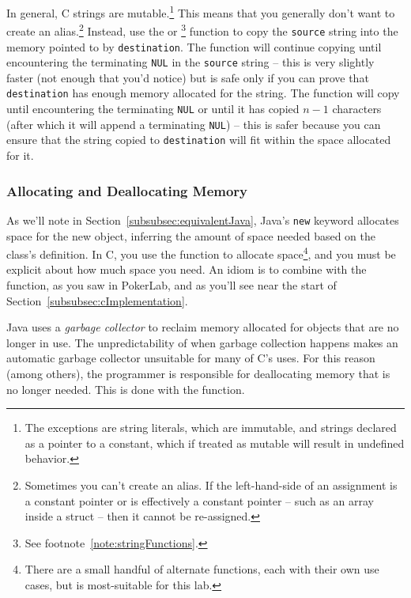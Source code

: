 In general, C strings are mutable.\footnote{
    The exceptions are string literals, which are immutable, and strings declared as a pointer to a constant, which if treated as mutable will result in undefined behavior.
}
This means that you generally don't want to create an alias.\footnote{
    Sometimes you can't create an alias.
    If the left-hand-side of an assignment is a constant pointer or is effectively a constant pointer -- such as an array inside a struct -- then it cannot be re-assigned.
}
Instead, use the  or \footnote{See footnote~\ref{note:stringFunctions}.} function to copy the \lstinline{source} string into the memory pointed to by \lstinline{destination}.
The  function will continue copying until encountering the terminating \lstinline{NUL} in the \lstinline{source} string -- this is very slightly faster (not enough that you'd notice) but is safe only if you can prove that \lstinline{destination} has enough memory allocated for the string.
The  function will copy until encountering the terminating \lstinline{NUL} or until it has copied $n-1$ characters (after which it will append a terminating \lstinline{NUL}) -- this is safer because you can ensure that the string copied to \lstinline{destination} will fit within the space allocated for it.

\subsubsection{Allocating and Deallocating Memory}

As we'll note in Section~\ref{subsubsec:equivalentJava}, Java's \lstinline{new} keyword allocates space for the new object, inferring the amount of space needed based on the class's definition.
In C, you use the  function to allocate space\footnote{
    There are a small handful of alternate functions, each with their own use cases, but  is most-suitable for this lab.
}, and you must be explicit about how much space you need.
An idiom is to combine  with the  function, as you saw in PokerLab, and as you'll see near the start of Section~\ref{subsubsec:cImplementation}.

Java uses a \textit{garbage collector} to reclaim memory allocated for objects that are no longer in use.
The unpredictability of when garbage collection happens makes an automatic garbage collector unsuitable for many of C's uses.
For this reason (among others), the programmer is responsible for deallocating memory that is no longer needed.
This is done with the  function.


